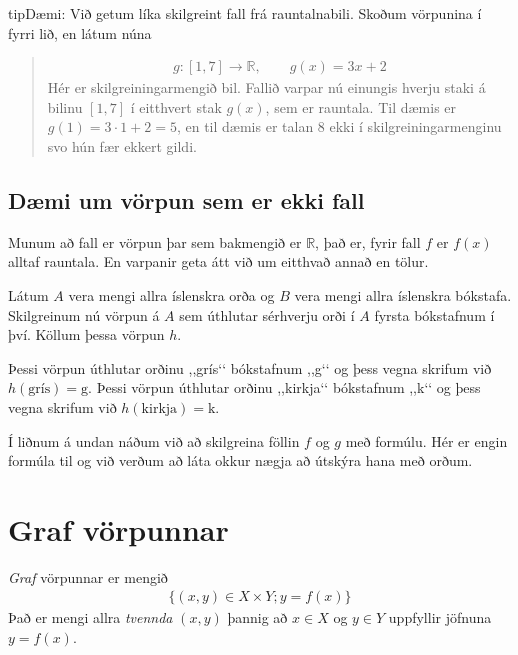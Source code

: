 \documentclass[a4paper,10pt,icelandic]{sphinxmanual}
\begin{document}
\begin{sphinxadmonition}{tip}{Dæmi:}
 Við getum líka skilgreint fall frá rauntalnabili. Skoðum vörpunina í fyrri lið, en látum núna
\begin{quote}
\begin{equation*}
\begin{split}g: [1,7] \to \mathbb{R}, \qquad g(x)=3x+2\end{split}
\end{equation*}
Hér er skilgreiningarmengið bil. Fallið varpar nú einungis hverju staki á bilinu \([1,7]\) í eitthvert stak \(g(x)\), sem er rauntala. Til dæmis er \(g(1)=3 \cdot 1 + 2=5\), en til dæmis er talan \(8\) ekki í skilgreiningarmenginu svo hún fær ekkert gildi.
\end{quote}
\end{sphinxadmonition}


\subsection{Dæmi um vörpun sem er ekki fall}
\label{\detokenize{Kafli05:daemi-um-vorpun-sem-er-ekki-fall}}
Munum að fall er vörpun þar sem bakmengið er \(\mathbb{R}\), það er, fyrir fall \(f\) er \(f(x)\) alltaf rauntala. En varpanir geta átt við um eitthvað annað en tölur.

Látum \(A\) vera mengi allra íslenskra orða og \(B\) vera mengi allra íslenskra bókstafa. Skilgreinum nú vörpun á \(A\) sem úthlutar sérhverju orði í \(A\) fyrsta bókstafnum í því. Köllum þessa vörpun \(h\).

Þessi vörpun úthlutar orðinu ,,grís‘‘ bókstafnum ,,g‘‘ og þess vegna skrifum við \(h(\text{grís})=\text{g}\).
Þessi vörpun úthlutar orðinu ,,kirkja‘‘ bókstafnum ,,k‘‘ og þess vegna skrifum við \(h(\text{kirkja})=\text{k}\).

Í liðnum á undan náðum við að skilgreina föllin \(f\) og \(g\) með formúlu. Hér er engin formúla til og við verðum að láta okkur nægja að útskýra hana með orðum.


\section{Graf vörpunnar}
\label{\detokenize{Kafli05:graf-vorpunnar}}
\textit{Graf} vörpunnar er mengið
\begin{equation*}
\begin{split}\{(x,y) \in X \times Y;y=f(x)\}\end{split}
\end{equation*}
Það er mengi allra \textit{tvennda} \((x,y)\) þannig að \(x \in X\) og \(y \in Y\) uppfyllir jöfnuna \(y=f(x)\).
\end{document}
